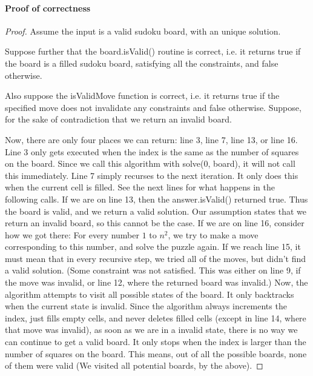 \documentclass[16pt]{article}
\begin{document}
\paragraph{Proof of correctness}
\begin{proof}
Assume the input is a valid sudoku board, with an unique solution.

Suppose further that the board.isValid() routine is correct, i.e. it returns true if the board is a filled sudoku board, satisfying all the constraints, and false otherwise.

Also suppose the isValidMove function is correct, i.e. it returns true if the specified move does not invalidate any constraints and false otherwise.
\newline
\newline
Suppose, for the sake of contradiction that we return an invalid board.


Now, there are only four places we can return: line 3, line 7, line 13, or line 16.
\newline
\newline
Line 3 only gets executed when the index is the same as the number of squares on the board. Since we call this algorithm with solve(0, board), it will not call this immediately.
\newline
\newline
Line 7 simply recurses to the next iteration. It only does this when the current cell is filled. See the next lines for what happens in the following calls.
\newline
\newline
If we are on line 13, then the answer.isValid() returned true. Thus the board is valid, and we return a valid solution. Our assumption states that we return an invalid board, so this cannot be the case.
\newline
\newline
If we are on line 16, consider how we got there:
For every number $1$ to $n^2$, we try to make a move corresponding to this number, and solve the puzzle again.
If we reach line 15, it must mean that in every recursive step, we tried all of the moves, but didn't find a valid solution. (Some constraint was not satisfied. This was either on line 9, if the move was invalid, or line 12, where the returned board was invalid.)
\newline
\newline
Now, the algorithm attempts to visit all possible states of the board. It only backtracks when the current state is invalid. Since the algorithm always increments the index, just fills empty cells, and never deletes filled cells (except in line 14, where that move was invalid), as soon as we are in a invalid state, there is no way we can continue to get a valid board.
It only stops when the index is larger than the number of squares on the board.
\newline
\newline
This means, out of all the possible boards, none of them were valid (We visited all potential boards, by the above).


\end{proof}
\end{document}
